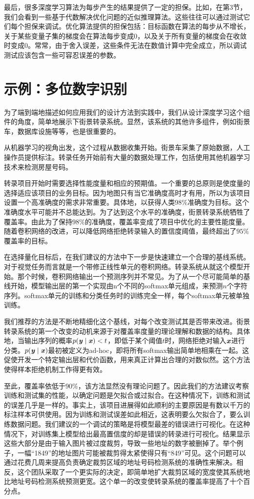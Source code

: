 最后，很多深度学习算法为每步产生的结果提供了一定的担保。比如，在第3节，我们会看到一些基于代数解决优化问题的近似推理算法。这些往往可以通过测试它们每个担保来调试。优化算法提供的担保包括：目标函数在算法的每步从不增长，关于某些变量子集的梯度会在算法每步变成0，以及关于所有变量的梯度会在收敛时变成0。常常，由于舍入误差，这些条件无法在数值计算中完全成立，所以调试测试应该包含一些可容忍误差的参数。

\section{示例：多位数字识别}
\label{sec:11.6}

为了端到端地描述如何应用我们的设计方法到实践中，我们从设计深度学习这个组件的角度，简单地展示下街景转录系统。显然，该系统的其他许多组件，例如街景车，数据库设施等等，也是很重要的。

从机器学习的视角出发，这个过程从数据收集开始。街景车采集了原始数据，人工操作员提供标注。转录任务开始前有大量的数据处理工作，包括使用其他机器学习技术来检测房屋号码。

转录项目开始时需要选择性能度量和相应的预期值。一个重要的总原则是使度量的选择适应该项目的业务目标。因为地图只有当它准确度高时才有用，所以为该项目设置一个高准确度的需求非常重要。具体地，以获得人类$98\%$准确度为目标。这个准确度水平可能并不总能达到。为了达到这个水平的准确度，街景转录系统牺牲了覆盖率。由此为了保持$98\%$的准确度，覆盖率变成了项目中优化的主要性能度量。随着卷积网络的改进，可以降低网络拒绝转录输入的置信度阈值，最终超出了$95\%$覆盖率的目标。

在选择量化目标后，在我们建议的方法中下一步是快速建立一个合理的基线系统。对于视觉任务而言就是一个带修正线性单元的卷积网络。转录系统从就这个模型开始。那个时候，卷积网络输出一个预测序列并不常见。为了从一个尽可能简单的基线开始，模型输出层的第一个实现由n个不同的softmax单元组成，来预测$n$个字符序列。softmax单元的训练和分类任务时的训练完全一样，每个softmax单元被单独训练。

我们推荐的方法是不断地精细化这个基线，对每个改变测试其是否带来改进。街景转录系统的第一个改变的动机来源于对覆盖率度量的理论理解和数据的结构。具体地，当输出序列的概率$p(\boldsymbol{\mathit{y}}\mid\boldsymbol{\mathit{x}}) < t$，即低于某个阈值$t$时，网络拒绝对输入$\boldsymbol{\mathit{x}}$进行分类。$p(\boldsymbol{\mathit{y}}\mid\boldsymbol{\mathit{x}})$最初被定义为ad-hoc，即将所有softmax输出简单地相乘在一起。这促使开发一个特定输出层和代价函数，用来真正计算出合理的对数似然。这个方法使得样本拒绝机制工作得更有效。

至此，覆盖率依低于$90\%$，该方法显然没有理论问题了。因此我们的方法建议考察训练和测试集的性能，以确定问题是欠拟合或过拟合。在这种情况下，训练和测试的误差几乎是一样的。事实上，该项目进展得如此顺利的主要原因是有数以千万的标注样本可供使用。因为训练和测试误差如此相近，这表明要么欠拟合了，要么训练数据问题。我们建议的一个调试的策略是将模型最差的错误进行可视化。在这种情况下，对训练集上模型给出最高置信度的却是错误的转录进行可视化。结果显示这些大部分是由于输入图片被过度裁剪，导致一些地址的数字被删掉了。举个例子，一幅``1849''的地址图片可能被裁剪得太紧使得只有``849''可见。这个问题可以通过花费几周来提高负责确定裁剪区域的地址号码检测系统的准确性来解决。相反，这个团队采取了一个更实际的决定，即简单地扩大裁剪区域的宽度使其系统地比地址号码检测系统预测更宽。这个单一的改变使转录系统的覆盖率提高了十个百分点。

